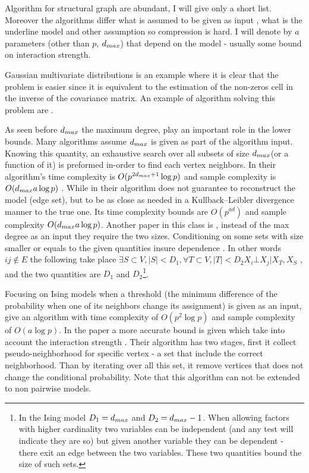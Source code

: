 Algorithm for structural graph are abundant, I will give only a short list.
Moreover the algorithms differ what is assumed to be given as input , what is the underline model and other assumption so compression is hard.
I will denote by $a$ parameters (other than $p$, $d_{max}$) that depend on the model - usually some bound on interaction strength.

Gaussian multivariate distributions  is an example where it is clear that the problem is easier since it  is equivalent to the estimation of the non-zeros cell in the inverse of the covariance matrix. An example of algorithm solving this problem are \cite{meinshausen2006high,yuan2007model, friedman2008sparse}. 

As seen before $d_{max}$ the maximum degree, play an important role in the lower bounds. Many algorithms \cite{bresler2008reconstruction, abbeel2006learning} assume  $d_{max}$ is given as  part of the algorithm input. Knowing this quantity, an exhaustive search over all subsets of size $d_{max}$(or a function of it) is preformed in-order to find each vertex neighbors.  In\cite{bresler2008reconstruction} their algorithm's time complexity is $O(p^{2d_{max}+1}\log p)$ and sample complexity is $O(d_{max} a \log p)$ . While in \cite{abbeel2006learning} their algorithm does not guarantee to reconstruct the model (edge set), but to be as close as needed in a Kullback–Leibler divergence manner to the true one. Its time complexity bounds are $O(p^{a d})$ and sample complexity $O(d_{max} a \log p)$. Another paper in this class is \cite{wu2013learning},  instead of the max degree as an input they require the two sizes. Conditioning on some sets with size smaller or equals to the given quantities insure dependence . In other words $ij \not \in E$ the following take place $\exists S \subset V, |S|< D_1, \forall T \subset V, |T|<D_2    X_i \bot X_j | X_T, X_S$ , and the two quantities are $D_1$ and $D_2$\footnote{In the Ising model $D_1 = d_{max}$ and $D_2 = d_{max} -1$. When allowing factors with higher cardinality two variables can be independent (and any test will indicate they are so) but given another variable they can be dependent - there exit an edge between the two variables. These two quantities bound the size of such sets. }. 

Focusing on Ising models when a threshold (the minimum difference of the probability when one of its neighbors change its assignment) is given as an input,  \cite{bresler2015efficiently} give an algorithm with time complexity of $O(p^2\log p)$ and sample complexity of $O( a \log p)$. In the paper a more accurate bound is given  which take into account the interaction strength . Their algorithm has two stages,  first it collect pseudo-neighborhood for specific vertex - a set that include the correct neighborhood. Than by iterating over all this set, it remove vertices that does not change the conditional probability. Note that this algorithm can not be extended to non pairwise models.

